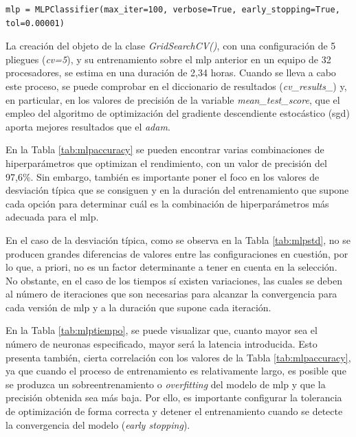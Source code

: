 \vspace{3mm}

\begin{lstlisting}[style=Python, caption={Clasificador MLP por defecto}]
  mlp = MLPClassifier(max_iter=100, verbose=True, early_stopping=True, tol=0.00001)
\end{lstlisting}

\vspace{3mm}

La creación del objeto de la clase \textit{GridSearchCV()}, con una configuración de 5 pliegues (\textit{cv=5}), y su entrenamiento sobre el \gls{mlp} anterior en un equipo de 32 procesadores, se estima en una duración de 2,34 horas. Cuando se lleva a cabo este proceso, se puede comprobar en el diccionario de resultados (\textit{cv\_results\_}) y, en particular, en los valores de precisión de la variable \textit{mean\_test\_score}, que el empleo del algoritmo de optimización del gradiente descendiente estocástico (\gls{sgd}) aporta mejores resultados que el \textit{adam}. 

\vspace{3mm}

En la Tabla \ref{tab:mlpaccuracy} se pueden encontrar varias combinaciones de hiperparámetros que optimizan el rendimiento, con un valor de precisión del 97,6\%. Sin embargo, también es importante poner el foco en los valores de desviación típica que se consiguen y en la duración del entrenamiento que supone cada opción para determinar cuál es la combinación de hiperparámetros más adecuada para el \gls{mlp}. 

\pagebreak

En el caso de la desviación típica, como se observa en la Tabla \ref{tab:mlpstd}, no se producen grandes diferencias de valores entre las configuraciones en cuestión, por lo que, a priori, no es un factor determinante a tener en cuenta en la selección. No obstante, en el caso de los tiempos sí existen variaciones, las cuales se deben al número de iteraciones que son necesarias para alcanzar la convergencia para cada versión de \gls{mlp} y a la duración que supone cada iteración. 

\vspace{3mm}

En la Tabla \ref{tab:mlptiempo}, se puede visualizar que, cuanto mayor sea el número de neuronas especificado, mayor será la latencia introducida. Esto presenta también, cierta correlación con los valores de la Tabla \ref{tab:mlpaccuracy}, ya que cuando el proceso de entrenamiento es relativamente largo, es posible que se produzca un sobreentrenamiento o \textit{overfitting} del modelo de \gls{mlp} y que la precisión obtenida sea más baja. Por ello, es importante configurar la tolerancia de optimización de forma correcta y detener el entrenamiento cuando se detecte la convergencia del modelo (\textit{early stopping}).

